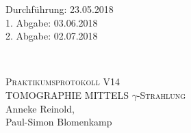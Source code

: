 



\begin{titlepage}
  \begin{flushleft}
 Durchführung: 23.05.2018\\
 1. Abgabe: 03.06.2018\\
 2. Abgabe: 02.07.2018
  \end{flushleft}


\HRule\\[1,0cm]

 \begin{center}


\textsc{\LARGE Praktikumsprotokoll V14}\\[1.5cm]
\textsc{\huge TOMOGRAPHIE MITTELS $\gamma$-Strahlung} \\[5,5cm]

Anneke Reinold\footnotemark[1], \\
Paul-Simon Blomenkamp\footnotemark[2] \\[1,0cm]



 \end{center}
\HRule

 \vfill

\end{titlepage}






\printbibliography


